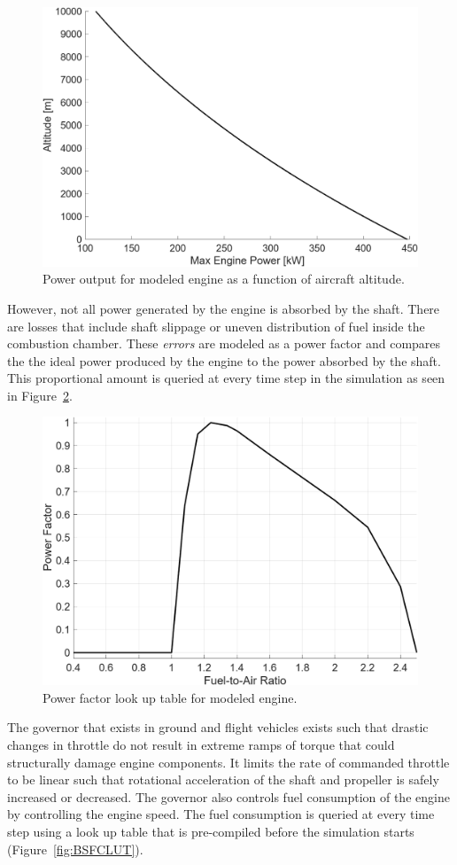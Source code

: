 \begin{figure}[!ht]
    \centering
    \includegraphics[width=0.85\linewidth]{Figures/gaggferrar.png}
    \caption{Power output for modeled engine as a function of aircraft altitude.}\label{fig:gaggferrar}
\end{figure}

However, not all power generated by the engine is absorbed by the shaft. There are losses that include shaft slippage or uneven distribution of fuel inside the combustion chamber. These \textit{errors} are modeled as a power factor and compares the the ideal power produced by the engine to the power absorbed by the shaft. This proportional amount is queried at every time step in the simulation as seen in Figure~\ref{fig:PFLUT}.

\begin{figure}[!ht]
    \centering
    \includegraphics[width=.75\linewidth]{Figures/PFLUT.png}
    \caption{Power factor look up table for modeled engine.}\label{fig:PFLUT}
\end{figure}

The governor that exists in ground and flight vehicles exists such that drastic changes in throttle do not result in extreme ramps of torque that could structurally damage engine components. It limits the rate of commanded throttle to be linear such that rotational acceleration of the shaft and propeller is safely increased or decreased. The governor also controls fuel consumption of the engine by controlling the engine speed. The fuel consumption is queried at every time step using a look up table that is pre-compiled before the simulation starts (Figure~\ref{fig:BSFCLUT}).

